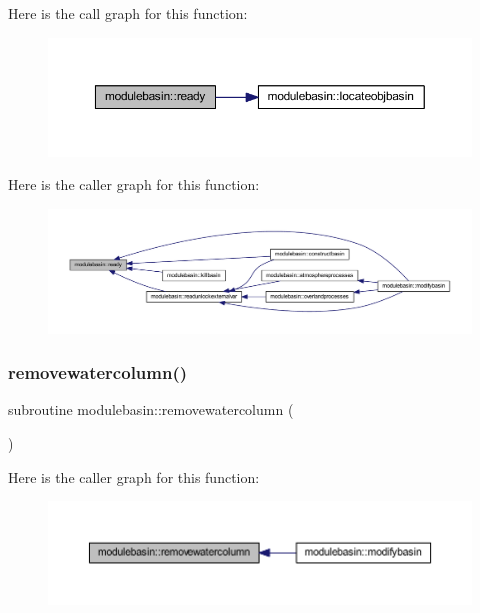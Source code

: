 Here is the call graph for this function\+:\nopagebreak
\begin{figure}[H]
\begin{center}
\leavevmode
\includegraphics[width=350pt]{namespacemodulebasin_afed1d3ff36b21d7528bddef4df954906_cgraph}
\end{center}
\end{figure}
Here is the caller graph for this function\+:\nopagebreak
\begin{figure}[H]
\begin{center}
\leavevmode
\includegraphics[width=350pt]{namespacemodulebasin_afed1d3ff36b21d7528bddef4df954906_icgraph}
\end{center}
\end{figure}
\mbox{\label{namespacemodulebasin_a2c7426bfbfa1e3a2540f18b8e04ec4b5}} 
\subsubsection{\texorpdfstring{removewatercolumn()}{removewatercolumn()}}
{\footnotesize\ttfamily subroutine modulebasin\+::removewatercolumn (\begin{DoxyParamCaption}{ }\end{DoxyParamCaption})\hspace{0.3cm}{\ttfamily [private]}}

Here is the caller graph for this function\+:\nopagebreak
\begin{figure}[H]
\begin{center}
\leavevmode
\includegraphics[width=350pt]{namespacemodulebasin_a2c7426bfbfa1e3a2540f18b8e04ec4b5_icgraph}
\end{center}
\end{figure}
\mbox{\label{namespacemodulebasin_a2d6933b0b62fd8ddf365de6af6309c1c}} 

